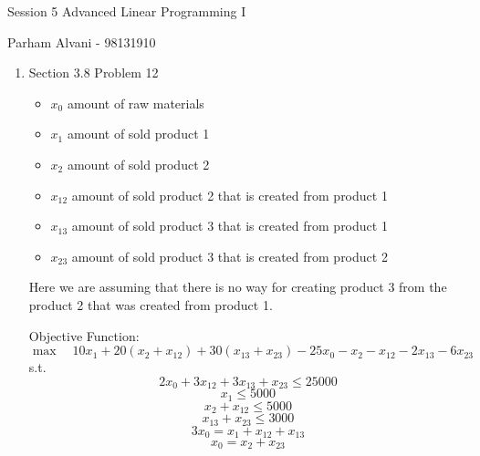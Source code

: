 \documentclass{article}
\begin{document}
\large %


{\Large Session 5 %
\hfill  Advanced Linear Programming I}

\begin{center}
{\Large Parham Alvani - 98131910} %
\end{center}
\vspace{0.05in}


\begin{enumerate}

\item Section 3.8 Problem 12
\begin{itemize}
\item \(x_0\) amount of raw materials
\item \(x_1\) amount of sold product 1
\item \(x_2\) amount of sold product 2
\item \(x_{12}\) amount of sold product 2 that is created from product 1
\item \(x_{13}\) amount of sold product 3 that is created from product 1
\item \(x_{23}\) amount of sold product 3 that is created from product 2
\end{itemize}
\par
Here we are assuming that there is no way for creating product 3 from the product 2 that was created from product 1.
\par
Objective Function:
\[
    \max\quad10x_1 + 20 (x_2 + x_{12}) + 30 (x_{13} + x_{23}) - 25x_0 - x_2 - x_{12} - 2x_{13} - 6x_{23}
\]
s.t.
\[
    2x_0 + 3x_{12} + 3x_{13} + x_{23} \le 25000
\]
\[
    x_1 \le 5000
\]
\[
    x_2 + x_{12} \le 5000
\]
\[
    x_{13} + x_{23} \le 3000
\]
\[
    3x_0  = x_1 + x_{12} + x_{13}
\]
\[
    x_0  = x_2 + x_{23}
\]

\end{enumerate}

\end{document}
